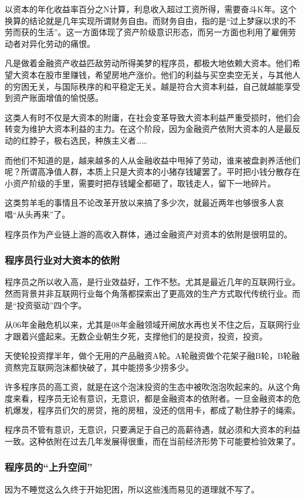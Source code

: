 \documentclass[punct=kaiming, zihao=5, openany, fontset=sikou]{ctexbook}
\begin{document}
以资本的年化收益率百分之N计算，利息收入超过工资所得，需要奋斗K年。这个换算的结论就是几年实现所谓财务自由。而财务自由，指的是“过上梦寐以求的不劳而获的生活”。这一方面体现了资产阶级意识形态，而另一方面也利用了雇佣劳动者对异化劳动的痛恨。

凡是做着金融资产收益匹敌劳动所得美梦的程序员，都极大地依赖大资本。他们希望大资本在股市里赚钱，希望房地产涨价。他们的利益与买空卖空无关，与其他人的穷困无关，与国际秩序的和平稳定无关。越是符合大资本利益，自己就越能享受到资产账面增值的愉悦感。

这类人有时不仅是大资本的附庸，在社会变革导致大资本利益严重受损时，他们会转变为维护大资本利益的主力。在这个阶段，因为金融资产依附大资本的人是最反动的红脖子，极右选民，种族主义者……

而他们不知道的是，越来越多的人从金融收益中甩掉了劳动，谁来被盘剥养活他们呢？所谓高净值人群，本质上只是大资本的小猪存钱罐罢了。平时把小钱分散存在小资产阶级的手里，需要时把存钱罐全都砸了，取钱走人，留下一地碎片。

这类剪羊毛的事情且不论改革开放以来搞了多少次，就最近两年也够很多人哀唱“从头再来”了。

程序员作为产业链上游的高收入群体，通过金融资产对资本的依附是很明显的。

\subsubsection{程序员行业对大资本的依附}
程序员之所以收入高，是行业效益好，工作不愁。尤其是最近几年的互联网行业。然而背景并非互联网行业每个角落都探索出了更高效的生产方式取代传统行业。而是“投资驱动”四个字。

从06年金融危机以来，尤其是08年金融领域开闸放水再也关不住之后，互联网行业才跟着兴盛起来。无数企业朝生夕死，支撑他们的是投资，投资，投资。

天使轮投资撑半年，做个无用的产品融资A轮。A轮融资做个花架子融B轮，B轮融资熬完互联网泡沫都快破了，其中能捞多少捞多少。

许多程序员的高工资，就是在这个泡沫投资的生态中被吹泡泡吹起来的。从这个角度来看，程序员无论有意识，无意识，都是金融资本的依附者。一旦金融资本的危机爆发，程序员们欠的房贷，拖的房租，没还的信用卡，都成了勒住脖子的绳索。

程序员不管有意识，无意识，只要满足于自己的高薪待遇，就必须和大资本的利益一致。这种依附在过去几年发展得很重，而在当前经济形势下可能要检验效果了。

\subsubsection{程序员的“上升空间”}
\begin{note}
  因为不睡觉这么久终于开始犯困，所以这些浅而易见的道理就不写了。
\end{note}
\end{document}
